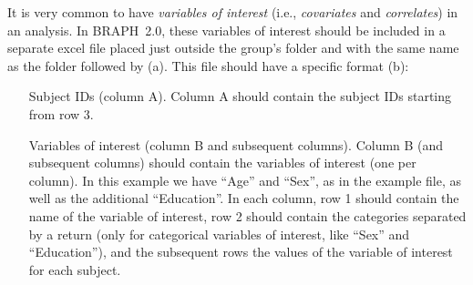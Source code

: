 \documentclass[justified]{tufte-handout}
\begin{document}
It is very common to have \emph{variables of interest} (i.e., \emph{covariates} and \emph{correlates}) in an analysis. In BRAPH~2.0, these variables of interest should be included in a separate excel file placed just outside the group's folder and with the same name as the folder followed by  (a). This file should have a specific format (b):
\begin{itemize}

\item[Subject IDs (column A).]
Column A should contain the subject IDs starting from row 3.

\item[Variables of interest (column B and subsequent columns).]
Column B (and subsequent columns) should contain the variables of interest (one per column). 
In this example we have ``Age'' and ``Sex'', as in the example file, as well as the additional ``Education''.
In each column, row 1 should contain the name of the variable of interest, row 2 should contain the categories separated by a return (only for categorical variables of interest, like ``Sex'' and ``Education''), and the subsequent rows the values of the variable of interest for each subject.

\end{itemize}	
\end{document}
